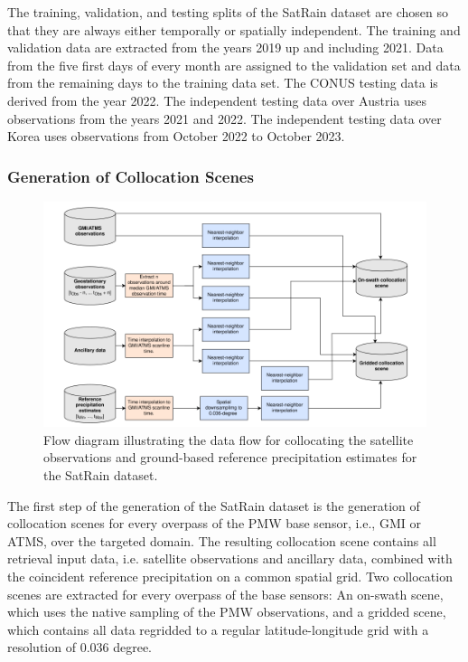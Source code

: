 \documentclass[11pt]{article}
\begin{document}
The training, validation, and testing splits of the SatRain dataset are chosen so that they are always either temporally or spatially independent. The training and validation data are extracted from the years 2019 up and including 2021. Data from the five first days of every month are assigned to the validation set and data from the remaining days to the training data set. The CONUS testing data is derived from the year 2022. The independent testing data over Austria uses observations from the years 2021 and 2022. The independent testing data over Korea uses observations from October 2022 to October 2023.

\subsubsection{Generation of Collocation Scenes}

\begin{figure}[htbp]
	\centering
	\includegraphics[width=1.0\textwidth]{figures/fig07}
	\caption{
		Flow diagram illustrating the data flow for collocating the satellite
		observations and ground-based reference precipitation estimates for the SatRain
		dataset.
	}
	\label{fig:data_flow}
\end{figure}

The first step of the generation of the SatRain dataset is the generation of
collocation scenes for every overpass of the PMW base sensor, i.e., GMI or ATMS,
over the targeted domain. The resulting collocation scene contains all retrieval
input data, i.e. satellite observations and ancillary data, combined with the
coincident reference precipitation on a common spatial grid. Two collocation
scenes are extracted for every overpass of the base sensors: An on-swath scene,
which uses the native sampling of the PMW observations, and a gridded scene,
which contains all data regridded to a regular latitude-longitude grid with a
resolution of 0.036 degree.
\end{document}
